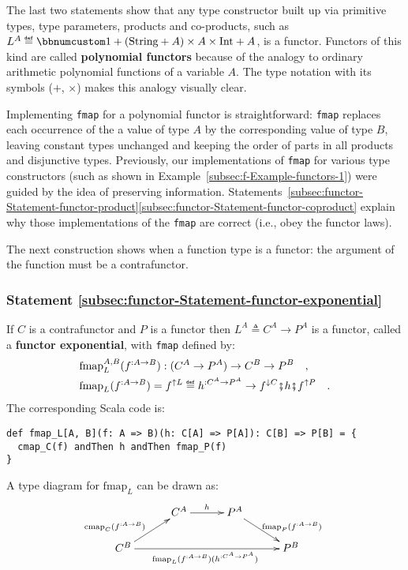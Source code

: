 The last two statements show that any type constructor built up via
primitive types, type parameters, products and co-products, such as
$L^{A}\triangleq\bbnum 1+(\text{String}+A)\times A\times\text{Int}+A$,
is a functor. Functors of this kind are called \textbf{polynomial
functors} because of the analogy to ordinary arithmetic polynomial
functions of a variable $A$. The type notation with its symbols ($+$,
$\times$) makes this analogy visually clear. 

Implementing \lstinline!fmap! for a polynomial functor is straightforward:
\lstinline!fmap! replaces each occurrence of the a value of type
$A$ by the corresponding value of type $B$, leaving constant types
unchanged and keeping the order of parts in all products and disjunctive
types. Previously, our implementations of \lstinline!fmap! for various
type constructors (such as shown in Example~\ref{subsec:f-Example-functors-1})
were guided by the idea of preserving information. Statements~\ref{subsec:functor-Statement-functor-product}\textendash \ref{subsec:functor-Statement-functor-coproduct}
explain why those implementations of the \lstinline!fmap! are correct
(i.e., obey the functor laws).

The next construction shows when a function type is a functor: the
argument of the function must be a contrafunctor.

\subsubsection{Statement \label{subsec:functor-Statement-functor-exponential}\ref{subsec:functor-Statement-functor-exponential}}

If $C$ is a contrafunctor and $P$ is a functor then $L^{A}\triangleq C^{A}\rightarrow P^{A}$
is a functor, called a \textbf{functor
exponential}, with \lstinline!fmap! defined by:
\begin{align}
 & \text{fmap}_{L}^{A,B}(f^{:A\rightarrow B}):(C^{A}\rightarrow P^{A})\rightarrow C^{B}\rightarrow P^{B}\quad,\nonumber \\
 & \text{fmap}_{L}(f^{:A\rightarrow B})=f^{\uparrow L}\triangleq h^{:C^{A}\rightarrow P^{A}}\rightarrow f^{\downarrow C}\bef h\bef f^{\uparrow P}\quad.\label{eq:f-functor-exponential-def-of-fmap}
\end{align}
The corresponding Scala code is:
\begin{lstlisting}
def fmap_L[A, B](f: A => B)(h: C[A] => P[A]): C[B] => P[B] = {
  cmap_C(f) andThen h andThen fmap_P(f)
}
\end{lstlisting}
A type diagram for $\text{fmap}_{L}$ can be drawn as:
\[
\xymatrix{\xyScaleY{1.5pc}\xyScaleX{2.5pc} & C^{A}\ar[r]\sp(0.5){h} & P^{A}\ar[rd]\sp(0.6){\ \text{fmap}_{P}(f^{:A\rightarrow B})\ }\\
C^{B}\ar[ru]\sp(0.4){\text{cmap}_{C}(f^{:A\rightarrow B})\ ~~}\ar[rrr]\sb(0.5){\text{fmap}_{L}(f^{:A\rightarrow B})(h^{:C^{A}\rightarrow P^{A}})\ } &  &  & P^{B}
}
\]


